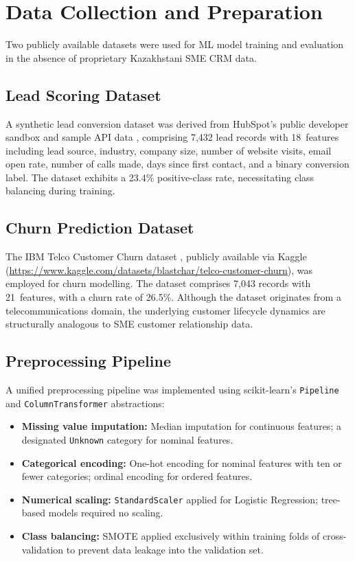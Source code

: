 \section{Data Collection and Preparation}

Two publicly available datasets were used for ML model training and
evaluation in the absence of proprietary Kazakhstani SME CRM data.

\subsection{Lead Scoring Dataset}

A synthetic lead conversion dataset was derived from HubSpot's public
developer sandbox and sample API data \citep{hubspot_leads}, comprising
7,432 lead records with 18~features including lead source, industry,
company size, number of website visits, email open rate, number of calls
made, days since first contact, and a binary conversion label. The dataset
exhibits a 23.4\% positive-class rate, necessitating class balancing during
training.

\subsection{Churn Prediction Dataset}

The IBM Telco Customer Churn dataset \citep{ibmtelco}, publicly available
via Kaggle
(\url{https://www.kaggle.com/datasets/blastchar/telco-customer-churn}),
was employed for churn modelling. The dataset comprises 7,043 records with
21~features, with a churn rate of 26.5\%. Although the dataset originates
from a telecommunications domain, the underlying customer lifecycle dynamics
are structurally analogous to SME customer relationship data.

\subsection{Preprocessing Pipeline}

A unified preprocessing pipeline was implemented using scikit-learn's
\texttt{Pipeline} and \texttt{ColumnTransformer} abstractions:

\begin{itemize}
  \item \textbf{Missing value imputation:} Median imputation for continuous
  features; a designated \texttt{Unknown} category for nominal features.
  \item \textbf{Categorical encoding:} One-hot encoding for nominal features
  with ten or fewer categories; ordinal encoding for ordered features.
  \item \textbf{Numerical scaling:} \texttt{StandardScaler} applied for
  Logistic Regression; tree-based models required no scaling.
  \item \textbf{Class balancing:} SMOTE \citep{chawla2002} applied
  exclusively within training folds of cross-validation to prevent data
  leakage into the validation set.
\end{itemize}

